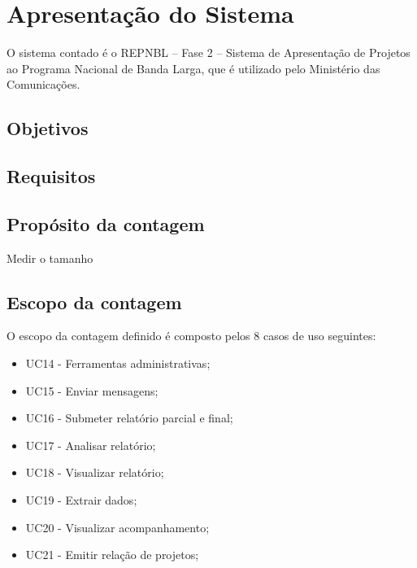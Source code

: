 \chapter{Apresentação do Sistema}

O sistema contado é o REPNBL – Fase 2 – Sistema de Apresentação de Projetos ao Programa Nacional de Banda Larga, que é utilizado pelo Ministério das Comunicações.

\section{Objetivos}

	
\section{Requisitos}

\section{Propósito da contagem}
	Medir o tamanho 

\section{Escopo da contagem}
	 O escopo da contagem definido é composto pelos 8 casos de uso seguintes:
	 
  \begin{itemize}
	  

      \item UC14 - Ferramentas administrativas;
      \item UC15 - Enviar mensagens;
      \item UC16 - Submeter relatório parcial e final;
      \item UC17 - Analisar relatório;
      \item UC18 - Visualizar relatório;
      \item UC19 - Extrair dados;
      \item UC20 - Visualizar acompanhamento;
      \item UC21 - Emitir relação de projetos;	

  \end{itemize}
